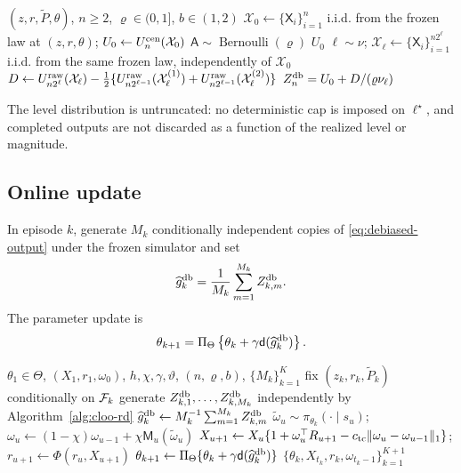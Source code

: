 \begin{algorithm}[t]
\caption{One centered-LOO debiased CPT-gradient output}\label{alg:cloo-rd}
\begin{algorithmic}[1]
\Require $(z,r,\widetilde P,\theta)$, $n\ge2$, $\varrho\in(0,1]$, $b\in(1,2)$
\State $\mathcal X_0\gets\{\mathsf X_i\}_{i=1}^{n}$ i.i.d. from the frozen law at $(z,r,\theta)$; \quad $U_0\gets U_n^{\rm cen}(\mathcal X_0)$
\State $\mathsf A\sim\operatorname{Bernoulli}(\varrho)$
    \State \Return $U_0$
\EndIf
\State $\ell\sim\nu$; \quad $\mathcal X_\ell\gets\{\mathsf X_i\}_{i=1}^{n2^\ell}$ i.i.d. from the same frozen law, independently of $\mathcal X_0$
\State $D\gets U_{n2^\ell}^{\rm raw}(\mathcal X_\ell)-\tfrac12\{U_{n2^{\ell-1}}^{\rm raw}(\mathcal X_\ell^{(1)})+U_{n2^{\ell-1}}^{\rm raw}(\mathcal X_\ell^{(2)})\}$
\State \Return $Z_n^{\mathrm{db}}=U_0+D/(\varrho\nu_\ell)$
\end{algorithmic}
\end{algorithm}

The level distribution is untruncated: no deterministic cap is imposed on $\ell^\star$, and completed outputs are not discarded as a function of the realized level or magnitude.

\subsection{Online update}

In episode $k$, generate $M_k$ conditionally independent copies of \eqref{eq:debiased-output} under the frozen simulator and set
\begin{equation}\label{eq:gradient-average}
 \widehat g_k^{\mathrm{db}}
 =\frac1{M_k}\sum_{m=1}^{M_k}Z_{k,m}^{\mathrm{db}}.
\end{equation}
The parameter update is
\begin{equation}\label{eq:parameter-update}
 \theta_{k+1}
 =\Pi_\Theta\left\{\theta_k+\gamma\mathsf d(\widehat g_k^{\mathrm{db}})\right\}.
\end{equation}

\begin{algorithm}[t]
\caption{Dynamic-reference CPT policy gradient (\DRCPTPG)}\label{alg:drcptpg}
\begin{algorithmic}[1]
\Require $\theta_1\in\Theta$, $(X_1,r_1,\omega_0)$, $h,\chi,\gamma,\vartheta$, $(n,\varrho,b)$, $\{M_k\}_{k=1}^{K}$
    \State fix $(z_k,r_k,\widetilde P_k)$ conditionally on $\mathcal F_k$
    \State generate $Z_{k,1}^{\mathrm{db}},\ldots,Z_{k,M_k}^{\mathrm{db}}$ independently by Algorithm~\ref{alg:cloo-rd}
    \State $\widehat g_k^{\mathrm{db}}\gets M_k^{-1}\sum_{m=1}^{M_k}Z_{k,m}^{\mathrm{db}}$
        \State $\widetilde\omega_u\sim\pi_{\theta_k}(\cdot\mid s_u)$; \quad $\omega_u\gets(1-\chi)\omega_{u-1}+\chi\mathsf M_u(\widetilde\omega_u)$
        \State $X_{u+1}\gets X_u\{1+\omega_u^\top R_{u+1}-c_{\rm tc}\lVert\omega_u-\omega_{u-1}\rVert_1\}$; \quad $r_{u+1}\gets\Phi(r_u,X_{u+1})$
    \EndFor
    \State $\theta_{k+1}\gets\Pi_\Theta\{\theta_k+\gamma\mathsf d(\widehat g_k^{\mathrm{db}})\}$
\EndFor
\State \Return $\{\theta_k,X_{t_k},r_k,\omega_{t_k-1}\}_{k=1}^{K+1}$
\end{algorithmic}
\end{algorithm}
